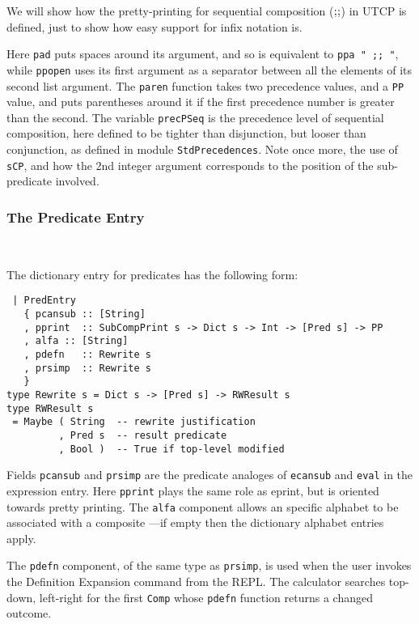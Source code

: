 We will show how the pretty-printing for
sequential composition  ($\mathrel{\mathbf{;\!;}}$) in UTCP is defined,
just to show how easy support for infix notation is.
Here \texttt{pad} puts spaces around its argument,
and so is equivalent to \verb$ppa " ;; "$,
while \texttt{ppopen} uses its first argument as a
separator between all the elements of its second list argument.
The \texttt{paren} function takes two precedence values,
and a \texttt{PP} value, and puts parentheses around it if the first precedence
number is greater than the second.
The variable \texttt{precPSeq} is the precedence level of sequential composition,
here defined to be tighter than disjunction,
but looser than conjunction, as defined in module \texttt{StdPrecedences}.
Note once more, the use of \texttt{sCP}, and how the 2nd integer argument
corresponds to the position of the sub-predicate involved.

\subsubsection{The Predicate Entry}~

The dictionary entry for predicates has the following form:
\begin{verbatim}
 | PredEntry
   { pcansub :: [String]
   , pprint  :: SubCompPrint s -> Dict s -> Int -> [Pred s] -> PP
   , alfa :: [String]
   , pdefn   :: Rewrite s
   , prsimp  :: Rewrite s
   }
type Rewrite s = Dict s -> [Pred s] -> RWResult s
type RWResult s
 = Maybe ( String  -- rewrite justification
         , Pred s  -- result predicate
         , Bool )  -- True if top-level modified
\end{verbatim}


Fields \texttt{pcansub} and \texttt{prsimp} are the predicate analoges
of \texttt{ecansub} and \texttt{eval} in the expression entry.
Here \texttt{pprint} plays the same role as eprint,
but is oriented towards pretty printing.
The \texttt{alfa} component allows an specific alphabet to
be associated with a composite
---if empty then the dictionary alphabet entries apply.

The \texttt{pdefn} component, of the same type as \texttt{prsimp},
is used when the user invokes the Definition Expansion
command from the REPL.
The calculator searches top-down, left-right
    for the first \texttt{Comp} whose \texttt{pdefn} function
    returns a changed outcome.

